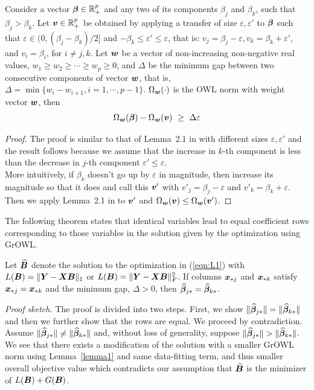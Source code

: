 \begin{lemma}\label{lemma1}
Consider a vector $\boldsymbol{\beta} \in {\mathbb R}^p_+$ and any two of its components $\beta_j$ and $\beta_k$, such that $\beta_j > \beta_k$. Let $\boldsymbol{v} \in {\mathbb R}^p_+$ be obtained by applying a transfer of size $\varepsilon, \varepsilon'$ to $\boldsymbol{\beta}$ such that $\varepsilon \in (0, (\beta_j - \beta_k )/2]$ and $ -\beta_k \leq \varepsilon' \leq \varepsilon$, that is: $v_j = \beta_j - \varepsilon, v_k = \beta_k + \varepsilon'$, and $v_i = \beta_i$, for $i \neq j, k$. Let $\boldsymbol{w}$ be a vector of non-increasing non-negative real values, $w_1 \geq w_2 \geq \cdots \geq w_p \geq 0$, and $\Delta$ be the minimum gap between two consecutive components of vector
$\boldsymbol{w}$, that is, $\Delta = \min\{w_i - w_{i+1}, i = 1, \cdots, p - 1\}$. $\Omega_{\boldsymbol{w}}(\cdot)$ is the OWL norm with weight vector $\boldsymbol{w}$, then
$$\Omega_{\bw}(\bbeta) - \Omega_{\bw}(\bv) \ \geq \ \Delta \varepsilon $$
\end{lemma}

\begin{proof}
The proof is similar to that of Lemma~2.1 in \cite{owl} with different sizes $\varepsilon, \varepsilon'$ and the result follows because we assume that the increase in $k$-th component is less than the decrease in $j$-th component \ie $\varepsilon' \leq \varepsilon$.\\
More intuitively, if $\beta_k$ doesn't go up by $\varepsilon$ in magnitude, then increase its magnitude so that it does and call this $\boldsymbol{v}'$ with $v'_j = \beta_j - \varepsilon$ and $v'_k = \beta_k + \varepsilon$.  Then we apply Lemma~2.1 in \cite{owl} to $\boldsymbol{v}'$ and $\Omega_{\boldsymbol{w}}(\boldsymbol{v}) \leq \Omega_{\boldsymbol{w}}(\boldsymbol{v}')$. 
\end{proof}

The following theorem states that identical variables lead to equal coefficient rows corresponding to those variables in the solution given by the optimization using GrOWL.

\begin{theorem}\label{ident1}
Let $\widehat {\boldsymbol{B}}$ denote the solution to the optimization in (\ref{eqn:L1}) with $L(\boldsymbol{B}) = \|\boldsymbol{Y} - \boldsymbol{X} \boldsymbol{B} \|_1$ or $L(\boldsymbol{B}) = \|\boldsymbol{Y} - \boldsymbol{X} \boldsymbol{B} \|_F^2$.
If columns $\boldsymbol{x}_{{\ast} j}$ and $\boldsymbol{x}_{{\ast} k}$ satisfy $\boldsymbol{x}_{{\ast} j} = \boldsymbol{x}_{{\ast} k}$ and the minimum gap, $\Delta > 0$, then
$\widehat {\boldsymbol{\beta}}_{j {\ast}} = \widehat {\boldsymbol{\beta}}_{k {\ast}}$.
\end{theorem}

\textit{Proof sketch.}
The proof is divided into two steps. First, we show $\|\widehat {\boldsymbol{\beta}}_{j {\ast}}\| = \|\widehat {\boldsymbol{\beta}}_{k {\ast}}\|$ and then we further show that the rows are equal. 
We proceed by contradiction. Assume $\|\widehat {\boldsymbol{\beta}}_{j {\ast}}\| \neq \|\widehat {\boldsymbol{\beta}}_{k {\ast}}\|$ and, without loss of generality, suppose $\|\widehat {\boldsymbol{\beta}}_{j {\ast}}\| > \|\widehat {\boldsymbol{\beta}}_{k {\ast}}\|$. We see that there exists a modification of the solution with a smaller GrOWL norm using Lemma~\ref{lemma1} and same data-fitting term, and thus smaller overall objective value which contradicts our assumption that $\widehat {\boldsymbol{B}}$ is the minimizer of $L(\boldsymbol{B}) + G(\boldsymbol{B})$. \\

